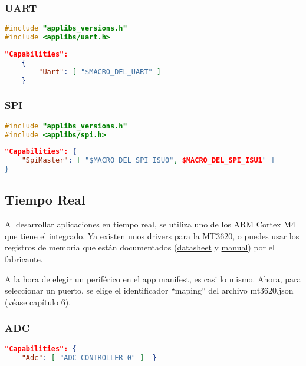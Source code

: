 \subsubsection{UART}
\begin{lstlisting}[language = C, firstnumber=0]
#include "applibs_versions.h"
#include <applibs/uart.h>
\end{lstlisting}
\begin{lstlisting}[language = json, firstnumber=0]	
	"Capabilities": 
	{  
		"Uart": [ "$MACRO_DEL_UART" ] 
	}
\end{lstlisting}

\subsubsection{SPI}
\begin{lstlisting}[language = C, firstnumber=0]
#include "applibs_versions.h"
#include <applibs/spi.h>
\end{lstlisting}
\begin{lstlisting}[language = json, firstnumber=0]	
"Capabilities": {  
	"SpiMaster": [ "$MACRO_DEL_SPI_ISU0", $MACRO_DEL_SPI_ISU1" ]
}
\end{lstlisting}

\subsection{Tiempo Real}
Al desarrollar aplicaciones en tiempo real, se utiliza uno de los ARM Cortex M4 que tiene el integrado. Ya existen unos \hyperlink{https://github.com/CodethinkLabs/mt3620-m4-drivers/tree/master}{drivers} para la MT3620, o puedes usar los registros de memoria que están documentados (\hyperlink{https://d86o2zu8ugzlg.cloudfront.net/mediatek-craft/documents/mt3620/MT3620-Datasheet-v1.7.pdf}{datasheet} y
\hyperlink{https://d86o2zu8ugzlg.cloudfront.net/mediatek-craft/documents/MT3620-M4-User-Manual.pdf}{manual}) por el fabricante.

A la hora de elegir un periférico en el app manifest, es casi lo mismo. Ahora, para seleccionar un puerto, se elige el identificador ``maping'' del archivo mt3620.json (véase capítulo 6).

\subsubsection{ADC}
\begin{lstlisting}[language = json, firstnumber=0]	
"Capabilities": {
	"Adc": [ "ADC-CONTROLLER-0" ]  }
\end{lstlisting}

